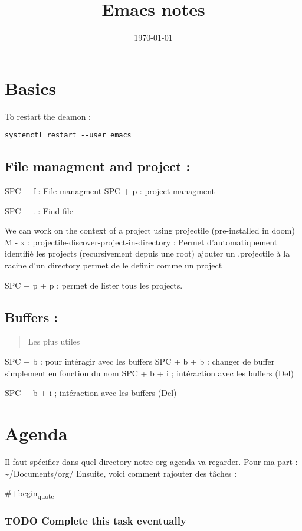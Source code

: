 \documentclass[11pt]{article}
\date{\today}
\title{Emacs notes}
\begin{document}
\maketitle
\tableofcontents

\section{Basics}
\label{sec:org7f7682e}
To restart the deamon :
\begin{verbatim}
systemctl restart --user emacs
\end{verbatim}
\subsection{File managment and project :}
\label{sec:org090f311}
SPC + f : File managment
SPC + p : project managment

SPC + . : Find file

We can work on the context of a project using projectile (pre-installed in doom)
M - x : projectile-discover-project-in-directory : Permet d'automatiquement identifié les projects (recursivement depuis une root)
ajouter un .projectile à la racine d'un directory permet de le definir comme un project

SPC + p + p : permet de lister tous les projects.
\subsection{Buffers :}
\label{sec:org035acf5}
\begin{quote}
Les plus utiles
\end{quote}
SPC + b : pour intéragir avec les buffers
SPC + b + b : changer de buffer simplement en fonction du nom
SPC + b + i ; intéraction avec les buffers (Del)

SPC + b + i ; intéraction avec les buffers (Del)
\section{Agenda}
\label{sec:orgc411d42}
Il faut spécifier dans quel directory notre org-agenda va regarder. Pour ma part : \textasciitilde{}/Documents/org/
Ensuite, voici comment rajouter des tâches :

\#+begin\textsubscript{quote}
\subsubsection{{\bfseries\sffamily TODO} Complete this task eventually}
\label{sec:org604dbdf}
\end{document}
